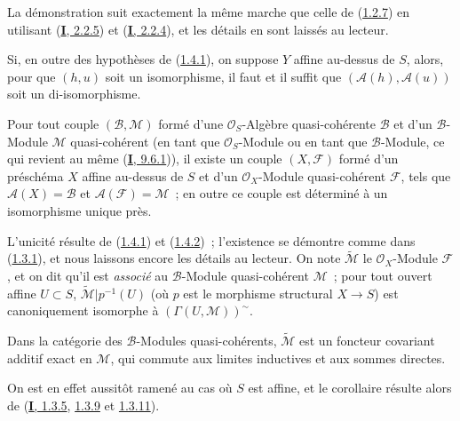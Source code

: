 La démonstration suit exactement la même marche que celle de
(\hyperref[II.1.2.7-fr]{1.2.7}) en utilisant
(\hyperref[I.2.2.5-fr]{\textbf{I}, 2.2.5}) et
(\hyperref[I.2.2.4-fr]{\textbf{I}, 2.2.4}), et les détails en sont laissés au
lecteur.

\begin{corollary}[1.4.2]
\label{II.1.4.2-fr}
Si, en outre des hypothèses de \textup{(\hyperref[II.1.4.1-fr]{1.4.1})}, on suppose
$Y$ affine au-dessus de $S$, alors, pour que $(h,u)$ soit un isomorphisme,
il faut et il suffit que $(\mathcal{A}(h),\mathcal{A}(u))$ soit un
di-isomorphisme.
\end{corollary}

\begin{proposition}[1.4.3]
\label{II.1.4.3-fr}
Pour tout couple $(\mathcal{B},\mathcal{M})$ formé d'une
$\mathcal{O}_S$-Algèbre quasi-cohérente $\mathcal{B}$ et d'un
$\mathcal{B}$-Module $\mathcal{M}$ quasi-cohérent \textup{(en tant que
$\mathcal{O}_S$-Module ou en tant que $\mathcal{B}$-Module, ce qui revient au
même (\hyperref[I.9.6.1-fr]{\textbf{I}, 9.6.1}))}, il existe un couple
$(X,\mathcal{F})$ formé d'un préschéma $X$ affine au-dessus de $S$ et d'un
$\mathcal{O}_X$-Module quasi-cohérent $\mathcal{F}$, tels que
$\mathcal{A}(X)=\mathcal{B}$ et $\mathcal{A}(\mathcal{F})=\mathcal{M}$~; en
outre ce couple est déterminé à un isomorphisme unique près.
\end{proposition}

L'unicité résulte de (\hyperref[II.1.4.1-fr]{1.4.1}) et
(\hyperref[II.1.4.2-fr]{1.4.2})~; l'existence se démontre comme dans
(\hyperref[II.1.3.1-fr]{1.3.1}), et nous laissons encore les détails au
lecteur. On note $\widetilde{\mathcal{M}}$ le $\mathcal{O}_X$-Module
$\mathcal{F}$, et on dit qu'il est \emph{associé} au $\mathcal{B}$-Module
quasi-cohérent $\mathcal{M}$~; pour tout ouvert affine $U\subset S$,
$\widetilde{\mathcal{M}}|p^{-1}(U)$ (où $p$ est le morphisme structural
$X\to S$) est canoniquement isomorphe à
$(\Gamma(U,\mathcal{M}))^{\sim}$.

\begin{corollary}[1.4.4]
\label{II.1.4.4-fr}
Dans la catégorie des $\mathcal{B}$-Modules quasi-cohérents,
$\widetilde{\mathcal{M}}$ est un foncteur covariant additif exact en
$\mathcal{M}$, qui commute aux limites inductives et aux sommes directes.
\end{corollary}

On est en effet aussitôt ramené au cas où $S$ est affine, et le corollaire
résulte alors de (\hyperref[I.1.3.5-fr]{\textbf{I}, 1.3.5},
\hyperref[I.1.3.9-fr]{1.3.9} et
\hyperref[I.1.3.11-fr]{1.3.11}).

